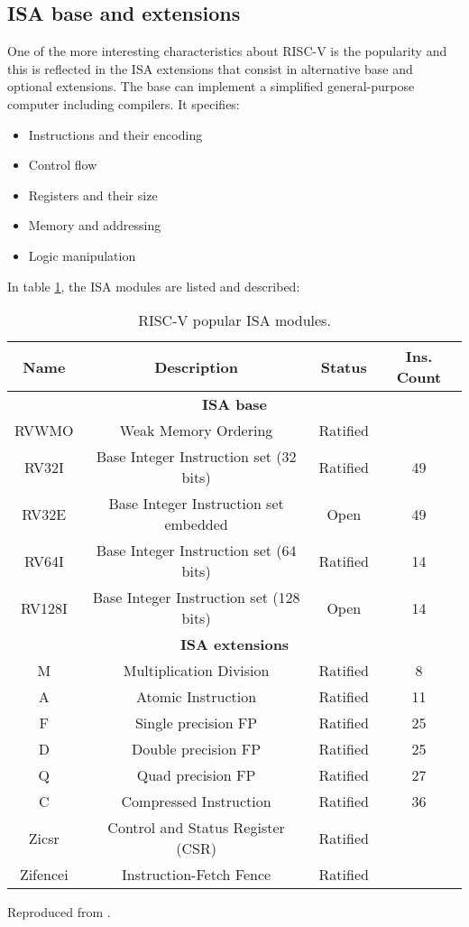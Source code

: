 \subsection{\gls{ISA} base and extensions} 
One of the more interesting characteristics about RISC-V is the popularity and this is reflected in the \gls{ISA} extensions that consist in alternative base and optional extensions. The base can implement a simplified general-purpose computer including compilers. It specifies: 

\begin{itemize}
	\item Instructions and their encoding
	\item Control flow
	\item Registers and their size
	\item Memory and addressing
	\item Logic manipulation
\end{itemize}

In table \ref{tab:isa}, the \gls{ISA} modules are listed and described:

\begin{table}[H]
\centering
\begin{tabular}{|c|c|c|c|}
\hline
\textbf{Name} & \textbf{Description} & \textbf{Status}  & \textbf{Ins. Count}  \\ \hline

\multicolumn{4}{|c|}{\textbf{\gls{ISA} base}} \\ \hline
RVWMO & Weak Memory Ordering & Ratified & \\ \hline
RV32I & Base Integer Instruction set (32 bits) & Ratified & 49 \\ \hline
RV32E & Base Integer Instruction set embedded & Open & 49 \\ \hline
RV64I & Base Integer Instruction set (64 bits) & Ratified & 14 \\ \hline
RV128I & Base Integer Instruction set (128 bits) & Open & 14 \\ \hline

\multicolumn{4}{|c|}{\textbf{\gls{ISA} extensions}} \\ \hline

M & Multiplication Division & Ratified & 8\\ \hline
A & Atomic Instruction & Ratified & 11 \\ \hline
F & Single precision FP & Ratified & 25 \\ \hline
D & Double precision FP & Ratified & 25 \\ \hline
Q & Quad precision FP & Ratified & 27 \\ \hline
C & Compressed Instruction & Ratified & 36 \\ \hline
Zicsr & Control and Status Register (CSR) & Ratified &  \\ \hline
Zifencei & Instruction-Fetch Fence & Ratified & \\ \hline
\end{tabular}
\caption{RISC-V popular \gls{ISA} modules.} Reproduced from \cite{riscvg}.
\label{tab:isa}
\end{table}

